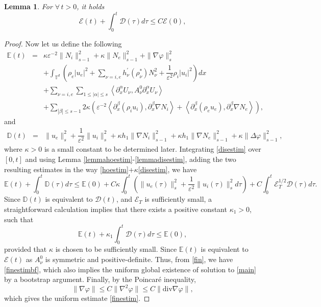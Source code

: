 \documentclass[reqno,twoside,12pt,a4paper]{amsart}
\newcommand{\T}{\mathbb{T}}
\newcommand{\eps}{\mathbb{\varepsilon}}
\newcommand{\al}{\alpha}
\newcommand{\dive}{\mathrm{div}}
\newcommand{\pa}{\partial}
\newcommand{\D}{\nabla}
\newcommand{\vp}{\varphi}
\newtheorem{lemma}{Lemma}[section]
\numberwithin{equation}{section}
\begin{document}
\begin{lemma}For $\forall\, t>0$, it holds
 \begin{equation}\label{finestimbf}
\mathscr{E}(t)+\int_0^t \mathscr{D}(\tau)d\tau\leq C\mathscr{E}(0),
\end{equation}
\end{lemma}
\begin{proof} Now let us define the following
\begin{eqnarray*}
\mathbb{E}(t)&=&\kappa\eps^{-2}\| N_i\|_{s-1}^2+\kappa\| N_e\|_{s-1}^2+\|\nabla \varphi\|^2_s\\
&\,&+ \int_{\T^d}\left(\rho_e|u_e|^2+\sum_{\nu=i,e}h^\prime_\nu(\rho_\nu^*)N_\nu^2+\dfrac{1}{\eps^2}\rho_i|u_i|^2\right)dx\\
&\,&+\sum_{\nu=i,e} \sum_{1\leq |\al| \leq s} \left\langle \pa_x^\al U_\nu, A_\nu^0 \pa_x^\al U_\nu \right\rangle\\
&\,&+\sum_{|\beta|\leq s-1}2\kappa\left(\eps^{-2}\left<\pa_x^\beta (\rho_i u_i), \pa_x^\beta \nabla N_i \right>+\left<\pa_x^\beta (\rho_e u_e), \pa_x^\beta \nabla N_e \right>\right),\nonumber
\end{eqnarray*}
and
\begin{eqnarray*}
\mathbb{D}(t)&=&\|u_e\|_s^2+\dfrac{1}{\eps^{2}} \|u_i\|_s^2+\kappa h_1\|\nabla N_i\|_{s-1}^2+\kappa h_1\|\nabla N_e\|_{s-1}^2+\kappa \|\Delta \vp\|_{s-1}^2,
\end{eqnarray*}
where $\kappa>0$ is a small constant to be determined later.  Integrating \eqref{disestim} over $[0,t]$ and using Lemma \ref{lemmahoestim}-\ref{lemmadisestim}, adding the two resulting estimates in the way \eqref{hoestim}+$\kappa$\eqref{disestim}, we have
\[
\mathbb{E}(t)+ \int_0^t\mathbb{D}(\tau)d\tau\leq \mathbb{E}(0)+C\kappa\int_0^t\left(\|u_e(\tau)\|_s^2+\dfrac{1}{\eps^{2}} \|u_i(\tau)\|_s^2d\tau\right)+ C\int_0^t\mathscr{E}_T^{1/2}\mathscr{D}(\tau)d\tau.
\]
Since  $\mathbb{D}(t)$ is equivalent to $\mathscr{D}(t)$, and $\mathscr{E}_T$ is sufficiently small, a straightforward calculation implies
that there exists a positive constant $\kappa_1>0$, such that
\begin{equation}\label{fin}
\mathbb{E}(t)+ \kappa_1\int_0^t \mathscr{D}(\tau)d\tau\leq \mathbb{E}(0),
\end{equation}
provided that $\kappa$ is chosen to be sufficiently small. Since $\mathbb{E}(t)$ is equivalent to $\mathscr{E}(t)$ as $A_\nu^0$ is symmetric and positive-definite. Thus, from \eqref{fin}, we have \eqref{finestimbf}, which also implies the uniform global existence of solution to \eqref{main} by a bootstrap argument. Finally, by the Poincar\'e inequality,
\[
\|\D\vp\|\leq C\|\D^2\vp\|\leq C\|\dive \D\vp\|,
\]
which gives the uniform estimate \eqref{finestim}.
\end{proof}
\end{document}
